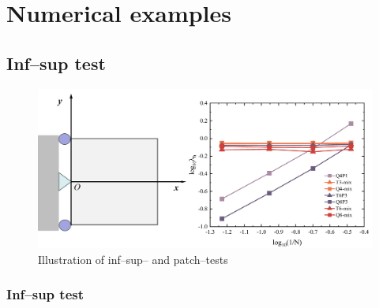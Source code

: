 \section{Numerical examples}

\subsection{Inf--sup test}

\begin{figure}[!ht]
\centering
\includegraphics[width=\textwidth]{png/inf-sup.png}
\caption{Illustration of inf--sup-- and patch--tests}\label{infsup_illsutration}
\end{figure}

\subsubsection{Inf--sup test}


